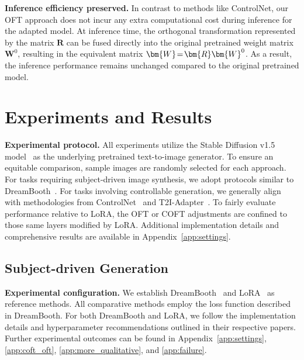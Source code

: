 \textbf{Inference efficiency preserved.} In contrast to methods like ControlNet, our OFT approach does not incur any extra computational cost during inference for the adapted model. At inference time, the orthogonal transformation represented by the matrix $\bm{R}$ can be fused directly into the original pretrained weight matrix $\bm{W}^0$, resulting in the equivalent matrix $\thickmuskip=2mu \medmuskip=2mu \bm{W} = \bm{R}\bm{W}^0$. As a result, the inference performance remains unchanged compared to the original pretrained model.

\section{Experiments and Results}

\textbf{Experimental protocol.} All experiments utilize the Stable Diffusion v1.5 model~\cite{rombach2022high} as the underlying pretrained text-to-image generator. To ensure an equitable comparison, sample images are randomly selected for each approach. For tasks requiring subject-driven image synthesis, we adopt protocols similar to DreamBooth~\cite{ruiz2023dreambooth}. For tasks involving controllable generation, we generally align with methodologies from ControlNet~\cite{zhang2023adding} and T2I-Adapter~\cite{mou2023t2i}. To fairly evaluate performance relative to LoRA, the OFT or COFT adjustments are confined to those same layers modified by LoRA. Additional implementation details and comprehensive results are available in Appendix~\ref{app:settings}.

\subsection{Subject-driven Generation}

\textbf{Experimental configuration.} We establish DreamBooth~\cite{ruiz2023dreambooth} and LoRA~\cite{hulora2022} as reference methods. All comparative methods employ the loss function described in DreamBooth. For both DreamBooth and LoRA, we follow the implementation details and hyperparameter recommendations outlined in their respective papers. Further experimental outcomes can be found in Appendix~\ref{app:settings}, \ref{app:coft_oft}, \ref{app:more_qualitative}, and \ref{app:failure}.

